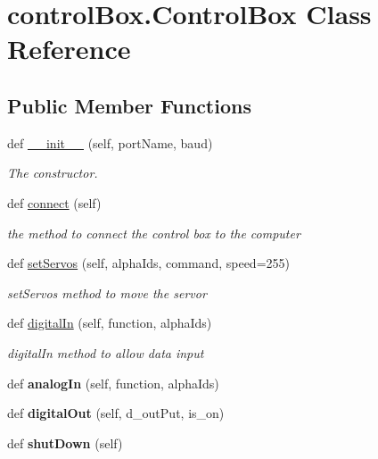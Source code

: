 \hypertarget{classcontrol_box_1_1_control_box}{}\section{control\+Box.\+Control\+Box Class Reference}
\label{classcontrol_box_1_1_control_box}
\subsection*{Public Member Functions}
\begin{DoxyCompactItemize}
\item 
def \mbox{\hyperlink{classcontrol_box_1_1_control_box_a29fb59eec02ca1447e3a06d4dae11386}{\+\_\+\+\_\+init\+\_\+\+\_\+}} (self, port\+Name, baud)
\begin{DoxyCompactList}\small\item\em The constructor. \end{DoxyCompactList}\item 
def \mbox{\hyperlink{classcontrol_box_1_1_control_box_a9f886d2e945475796bc405a02ace59a5}{connect}} (self)
\begin{DoxyCompactList}\small\item\em the method to connect the control box to the computer \end{DoxyCompactList}\item 
def \mbox{\hyperlink{classcontrol_box_1_1_control_box_ad2603c1dda6b71659b73f87626e98fc1}{set\+Servos}} (self, alpha\+Ids, command, speed=255)
\begin{DoxyCompactList}\small\item\em set\+Servos method to move the servor ~\newline
 \end{DoxyCompactList}\item 
def \mbox{\hyperlink{classcontrol_box_1_1_control_box_a040ca20ecdfd112f21ef18771d722599}{digital\+In}} (self, function, alpha\+Ids)
\begin{DoxyCompactList}\small\item\em digital\+In method to allow data input \end{DoxyCompactList}\item 
\mbox{\label{classcontrol_box_1_1_control_box_afd7f846813731127cd0f15906c981294}} 
def {\bfseries analog\+In} (self, function, alpha\+Ids)
\item 
\mbox{\label{classcontrol_box_1_1_control_box_a2cd1553ef7cd86181bb010498ac04ec0}} 
def {\bfseries digital\+Out} (self, d\+\_\+out\+Put, is\+\_\+on)
\item 
\mbox{\label{classcontrol_box_1_1_control_box_a889b1cbde3647c439a2d6dcea0c9e3ee}} 
def {\bfseries shut\+Down} (self)
\end{DoxyCompactItemize}
